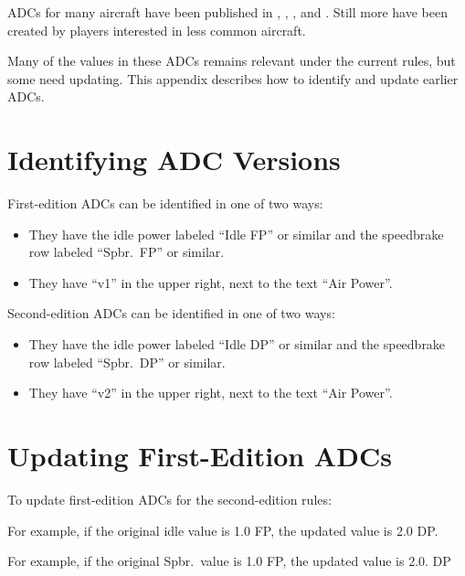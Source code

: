 

ADCs for many aircraft have been published in {\AirSup}, {\AirStr}, {\TSOH}, and {\APJ}. Still more have been created by players interested in less common aircraft. 

Many of the values in these ADCs remains relevant under the current rules, but some need updating. This appendix describes how to identify and update earlier ADCs.


\section{Identifying ADC Versions}

First-edition ADCs can be identified in one of two ways:
\begin{itemize} 
\item They have the idle power labeled “Idle FP” or similar and the speedbrake row labeled “Spbr.\ FP” or similar. 
\item They have “v1” in the upper right, next to the text “Air Power”.
\end{itemize}

Second-edition ADCs can be identified in one of two ways:
\begin{itemize} 
\item They have the idle power labeled “Idle DP” or similar and the speedbrake row labeled “Spbr.\ DP” or similar. 
\item They have “v2” in the upper right, next to the text “Air Power”.
\end{itemize}


\section{Updating First-Edition ADCs}

To update first-edition ADCs for the second-edition rules:

\begin{itemize}


For example, if the original idle value is 1.0 FP, the updated value is 2.0 DP.


For example, if the original Spbr.\ value is 1.0 FP, the updated value is 2.0. DP

\end{itemize}

